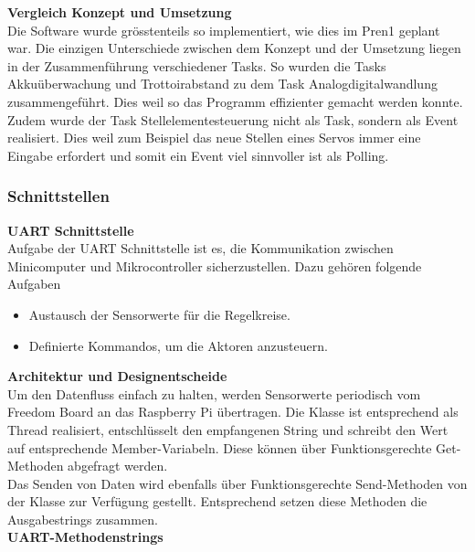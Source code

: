 \textbf{Vergleich Konzept und Umsetzung}\\[0.2cm]
Die Software wurde grösstenteils so implementiert, wie dies im Pren1 geplant war. Die einzigen Unterschiede zwischen dem Konzept und der Umsetzung liegen in der Zusammenführung verschiedener Tasks. So wurden die Tasks Akkuüberwachung und Trottoirabstand zu dem Task Analogdigitalwandlung zusammengeführt. Dies weil so das Programm effizienter gemacht werden konnte. Zudem wurde der Task Stellelementesteuerung nicht als Task, sondern als Event realisiert. Dies weil zum Beispiel das neue Stellen eines Servos immer eine Eingabe erfordert und somit ein Event viel sinnvoller ist als Polling. 
\subsubsection{Schnittstellen}
\textbf{UART Schnittstelle}\\[0.2cm]
Aufgabe der UART Schnittstelle ist es, die Kommunikation zwischen Minicomputer und Mikrocontroller sicherzustellen. Dazu gehören folgende Aufgaben
\begin{itemize}
\item Austausch der Sensorwerte für die Regelkreise.
\item Definierte Kommandos, um die Aktoren anzusteuern.
\end{itemize}
\textbf{Architektur und Designentscheide}\\[0.2cm]
Um den Datenfluss einfach zu halten, werden Sensorwerte periodisch vom Freedom Board an das Raspberry Pi übertragen. Die Klasse  ist entsprechend als Thread realisiert, entschlüsselt den empfangenen String und schreibt den Wert auf entsprechende Member-Variabeln. Diese können über Funktionsgerechte Get-Methoden abgefragt werden.\\
Das Senden von Daten wird ebenfalls über Funktionsgerechte Send-Methoden von der Klasse  zur Verfügung gestellt. Entsprechend setzen diese Methoden die Ausgabestrings zusammen.\\[0.2cm]
\newpage
\textbf{UART-Methodenstrings}
